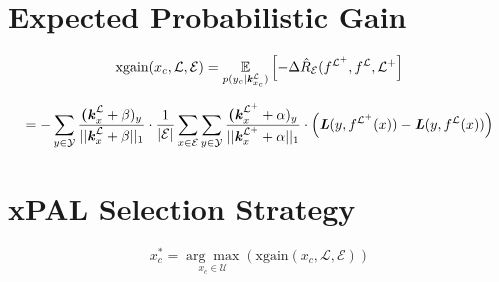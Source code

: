 \section{Expected Probabilistic Gain}

\begin{equation}
    \text{xgain}(x_c, \mathcal{L}, \mathcal{E}) = \underset{p(y_c|\textbf{\textit{k}}^{\mathcal{L}}_{x_c})}{\mathbb{E}} \left[ - \Delta \hat{R}_{\mathcal{E}} (f^{\mathcal{L}^+}, f^{\mathcal{L}}, \mathcal{L}^+ \right]
\end{equation}

\begin{equation}
    = - \sum_{y \in \mathcal{Y}}  \frac{\textbf{(\textit{k}}^{\mathcal{L}}_x + \beta)_y}{||\textbf{\textit{k}}^{\mathcal{L}}_x + \beta ||_1} \cdot \frac{1}{|\mathcal{E}|} \sum_{x \in \mathcal{E}} \sum_{y \in \mathcal{Y}}  \frac{\textbf{(\textit{k}}^{\mathcal{L}^+}_x + \alpha)_y}{||\textbf{\textit{k}}^{\mathcal{L}^+}_x + \alpha ||_1} \cdot \left( \textbf{\textit{L}} (y,f^{\mathcal{L}^+}(x)) - \textbf{\textit{L}}(y,f^{\mathcal{L}}(x)) \right)
\end{equation}

\section{xPAL Selection Strategy}

\begin{equation}
    x^*_c = \underset{x_c \in \mathcal{U}}{\arg \max} \left( \text{xgain} (x_c, \mathcal{L}, \mathcal{E}) \right)
\end{equation}
